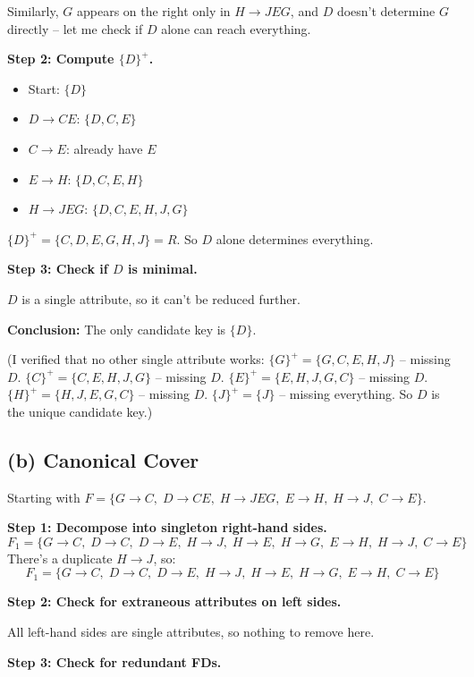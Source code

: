 \documentclass[11pt]{article}
\begin{document}
Similarly, $G$ appears on the right only in $H \to JEG$, and $D$ doesn't determine $G$ directly -- let me check if $D$ alone can reach everything.

\medskip
\noindent\textbf{Step 2: Compute $\{D\}^+$.}
\begin{itemize}
  \item Start: $\{D\}$
  \item $D \to CE$: $\{D, C, E\}$
  \item $C \to E$: already have $E$
  \item $E \to H$: $\{D, C, E, H\}$
  \item $H \to JEG$: $\{D, C, E, H, J, G\}$
\end{itemize}
$\{D\}^+ = \{C, D, E, G, H, J\} = R$. So $D$ alone determines everything.

\medskip
\noindent\textbf{Step 3: Check if $D$ is minimal.}

$D$ is a single attribute, so it can't be reduced further.

\medskip
\noindent\textbf{Conclusion:} The only candidate key is $\boxed{\{D\}}$.

\medskip
\noindent (I verified that no other single attribute works: $\{G\}^+ = \{G,C,E,H,J\}$ -- missing $D$. $\{C\}^+ = \{C,E,H,J,G\}$ -- missing $D$. $\{E\}^+ = \{E,H,J,G,C\}$ -- missing $D$. $\{H\}^+ = \{H,J,E,G,C\}$ -- missing $D$. $\{J\}^+ = \{J\}$ -- missing everything. So $D$ is the unique candidate key.)

\subsection{(b) Canonical Cover}

Starting with $F = \{G \to C,\; D \to CE,\; H \to JEG,\; E \to H,\; H \to J,\; C \to E\}$.

\medskip
\noindent\textbf{Step 1: Decompose into singleton right-hand sides.}
\[
F_1 = \{G \to C,\; D \to C,\; D \to E,\; H \to J,\; H \to E,\; H \to G,\; E \to H,\; H \to J,\; C \to E\}
\]
There's a duplicate $H \to J$, so:
\[
F_1 = \{G \to C,\; D \to C,\; D \to E,\; H \to J,\; H \to E,\; H \to G,\; E \to H,\; C \to E\}
\]

\medskip
\noindent\textbf{Step 2: Check for extraneous attributes on left sides.}

All left-hand sides are single attributes, so nothing to remove here.

\medskip
\noindent\textbf{Step 3: Check for redundant FDs.}
\end{document}
